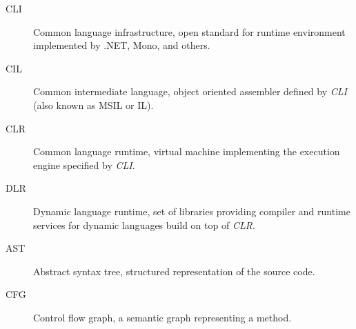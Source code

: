 
\begin{description}
	
	\item[CLI] Common language infrastructure, open standard for runtime environment implemented by .NET, Mono, and others.
	
	\item[CIL] Common intermediate language, object oriented assembler defined by \emph{CLI} (also known as MSIL or IL).
	
	\item[CLR] Common language runtime, virtual machine implementing the execution engine specified by \emph{CLI}.
	
	\item[DLR] Dynamic language runtime, set of libraries providing compiler and runtime services for dynamic languages build on top of \emph{CLR}.
	
	\item[AST] Abstract syntax tree, structured representation of the source code.
	
	\item[CFG] Control flow graph, a semantic graph representing a method.
	
\end{description}



